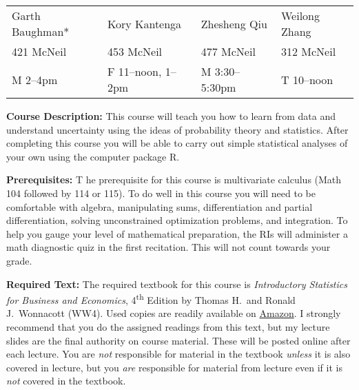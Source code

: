 \documentclass[11pt, letterpaper]{article}
\begin{document}
\begin{tabular}{llll}
Garth Baughman*&Kory Kantenga& Zhesheng Qiu&Weilong Zhang\\
421 McNeil&	453 McNeil&477 McNeil & 312 McNeil\\
M 2--4pm&F 11--noon, 1--2pm & M 3:30--5:30pm& T 10--noon\\
\end{tabular}


\bigskip

\noindent \textbf{Course Description:} 
This course will teach you how to learn from data and understand uncertainty using the ideas of probability theory and statistics. 
After completing this course you will be able to carry out simple statistical analyses of your own using the computer package R.


\medskip

\noindent \textbf{Prerequisites:} T
he prerequisite for this course is multivariate calculus (Math 104 followed by 114 or 115). 
To do well in this course you will need to be comfortable with algebra, manipulating sums, differentiation and partial differentiation, solving unconstrained optimization problems, and integration. 
To help you gauge your level of mathematical preparation, the RIs will administer a math diagnostic quiz in the first recitation. 
This will not count towards your grade.




\medskip

\noindent \textbf{Required Text:} 
The required textbook for this course is \emph{Introductory Statistics for Business and Economics}, 4\textsuperscript{th} Edition by Thomas H.\ and Ronald J.\ Wonnacott (WW4). 
Used copies are readily available on \href{http://tinyurl.com/ECON103-2013A}{Amazon}. 
I strongly recommend that you do the assigned readings from this text, but my lecture slides are the final authority on course material. 
These will be posted online after each lecture. You are \emph{not} responsible for material in the textbook \emph{unless} it is also covered in lecture, but you \emph{are} responsible for material from lecture even if it is \emph{not} covered in the textbook.

\medskip
\end{document}
